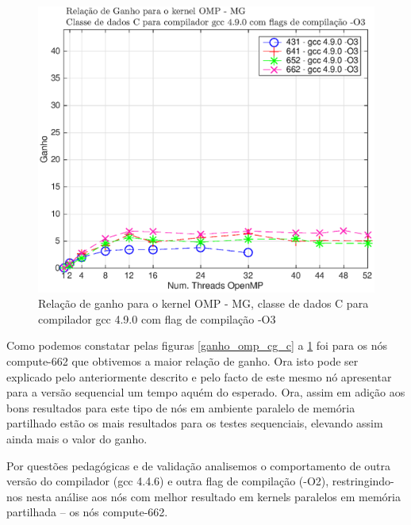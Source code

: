 \documentclass[conference,compsoc]{IEEEtran}
\begin{document}
\begin{figure}[H]
\centering
\includegraphics[width=1.1\columnwidth]{EPS/OMP/ganho_mg_03.eps}
\caption{Relação de ganho para o kernel OMP - MG, classe de dados C para  compilador gcc 4.9.0 com flag de compilação -O3}
\label{ganho_omp_mg_c}
\end{figure}

Como podemos constatar pelas figuras \ref{ganho_omp_cg_c} a \ref{ganho_omp_mg_c} foi para os nós compute-662 que obtivemos a maior relação de ganho. Ora isto pode ser explicado pelo anteriormente descrito e pelo facto de este mesmo nó apresentar para a versão sequencial um tempo aquém do esperado. Ora, assim em adição aos bons resultados para este tipo de nós em ambiente paralelo de memória partilhado estão os mais resultados para os testes sequenciais, elevando assim ainda mais o valor do ganho. \par 
Por questões pedagógicas e de validação analisemos o comportamento de outra versão do compilador (gcc 4.4.6) e outra flag de compilação (-O2), restringindo-nos nesta análise aos nós com melhor resultado em kernels paralelos em memória partilhada -- os nós compute-662.
\end{document}
